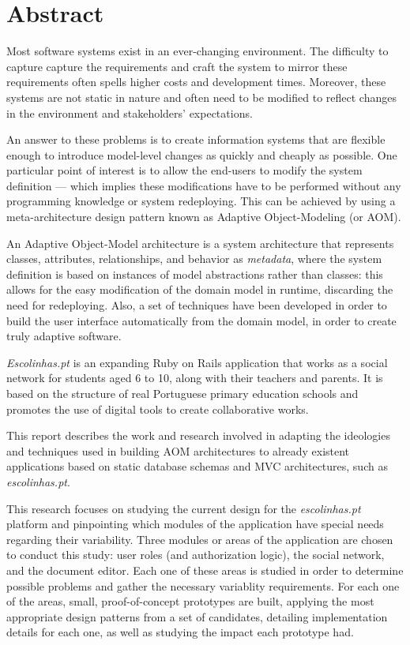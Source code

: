 \chapter*{Abstract}

Most software systems exist in an ever-changing environment. The difficulty to capture capture the requirements and craft the system to mirror these requirements often spells higher costs and development times. Moreover, these systems are not static in nature and often need to be modified to reflect changes in the environment and stakeholders' expectations.

An answer to these problems is to create information systems that are flexible enough to introduce model-level changes as quickly and cheaply as possible. One particular point of interest is to allow the end-users to modify the system definition --- which implies these modifications have to be performed without any programming knowledge or system redeploying. This can be achieved by using a meta-architecture design pattern known as Adaptive Object-Modeling (or AOM).

An Adaptive Object-Model architecture is a system architecture that represents classes, attributes, relationships, and behavior as \emph{metadata}, where the system definition is based on instances of model abstractions rather than classes: this allows for the easy modification of the domain model in runtime, discarding the need for redeploying. Also, a set of techniques have been developed in order to build the user interface automatically from the domain model, in order to create truly adaptive software.

\emph{Escolinhas.pt} is an expanding Ruby on Rails application that works as a social network for students aged 6 to 10, along with their teachers and parents. It is based on the structure of real Portuguese primary education schools and promotes the use of digital tools to create collaborative works.

This report describes the work and research involved in adapting the ideologies and techniques used in building AOM architectures to already existent applications based on static database schemas and MVC architectures, such as \emph{escolinhas.pt}.

This research focuses on studying the current design for the \emph{escolinhas.pt} platform and pinpointing which modules of the application have special needs regarding their variability. Three modules or areas of the application are chosen to conduct this study: user roles (and authorization logic), the social network, and the document editor. Each one of these areas is studied in order to determine possible problems and gather the necessary variablity requirements. For each one of the areas, small, proof-of-concept prototypes are built, applying the most appropriate design patterns from a set of candidates, detailing implementation details for each one, as well as studying the impact each prototype had.

